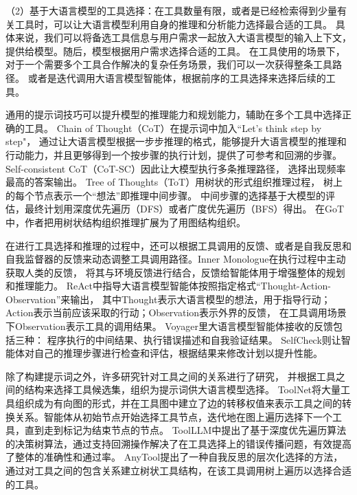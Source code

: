 （2）基于大语言模型的工具选择：在工具数量有限，或者是已经检索得到少量有关工具时，可以让大语言模型利用自身的推理和分析能力选择最合适的工具。
具体来说，我们可以将备选工具信息与用户需求一起放入大语言模型的输入上下文，提供给模型。随后，模型根据用户需求选择合适的工具。
在工具使用的场景下，对于一个需要多个工具合作解决的复杂任务场景，我们可以一次获得整条工具路径。
或者是迭代调用大语言模型智能体，根据前序的工具选择来选择后续的工具。

通用的提示词技巧可以提升模型的推理能力和规划能力，辅助在多个工具中选择正确的工具。
Chain of Thought（CoT）\cite{Wang2023a}在提示词中加入“Let's think step by step"，
通过让大语言模型根据一步步推理的格式，能够提升大语言模型的推理和行动能力，并且更够得到一个按步骤的执行计划，提供了可参考和回溯的步骤。
Self-consistent CoT（CoT-SC）\cite{wang2022self}因此让大模型执行多条推理路径，
选择出现频率最高的答案输出。
Tree of Thoughts（ToT）\cite{Yao2023a}用树状的形式组织推理过程，
树上的每个节点表示一个“想法”即推理中间步骤。
中间步骤的选择基于大模型的评估，最终计划用深度优先遍历（DFS）或者广度优先遍历（BFS）得出。
在GoT\cite{Besta2023}中，作者把用树状结构组织推理扩展为了用图结构组织。

在进行工具选择和推理的过程中，还可以根据工具调用的反馈、或者是自我反思和自我监督器的反馈来动态调整工具调用路径。Inner Monologue\cite{Huang2022}在执行过程中主动获取人类的反馈，
将其与环境反馈进行结合，反馈给智能体用于增强整体的规划和推理能力。
ReAct\cite{Yao2023b}中指导大语言模型智能体按照指定格式“Thought-Action-Observation”来输出，
其中Thought表示大语言模型的想法，用于指导行动；Action表示当前应该采取的行动；Observation表示外界的反馈，
在工具调用场景下Observation表示工具的调用结果。
Voyager\cite{Wang2023b}里大语言模型智能体接收的反馈包括三种：
程序执行的中间结果、执行错误描述和自我验证结果。
SelfCheck\cite{Miao2023}则让智能体对自己的推理步骤进行检查和评估，根据结果来修改计划以提升性能。

除了构建提示词之外，许多研究针对工具之间的关系进行了研究，
并根据工具之间的结构来选择工具候选集，组织为提示词供大语言模型选择。
ToolNet\cite{Liu2024}将大量工具组织成为有向图的形式，并在工具图中建立了边的转移权值来表示工具之间的转换关系。智能体从初始节点开始选择工具节点，迭代地在图上遍历选择下一个工具，直到走到标记为结束节点的节点。
ToolLLM\cite{Qin2023}中提出了基于深度优先遍历算法的决策树算法，通过支持回溯操作解决了在工具选择上的错误传播问题，有效提高了整体的准确性和通过率。
AnyTool\cite{Du2024}提出了一种自我反思的层次化选择的方法，通过对工具之间的包含关系建立树状工具结构，在该工具调用树上遍历以选择合适的工具。


